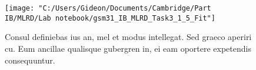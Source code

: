 \documentclass[11pt,a4paper]{report}
\begin{document}
    \begin{figure}[h]
        \centering
        \texttt{[image: "C:/Users/Gideon/Documents/Cambridge/Part IB/MLRD/Lab notebook/gsm31\_IB\_MLRD\_Task3\_1\_5\_Fit"]}
        \caption{Consul definiebas ius an, mel et modus intellegat. Sed graeco aperiri cu. Eum ancillae qualisque gubergren in, ei eam oportere expetendis consequuntur.}
    \end{figure}
  
\end{document}
